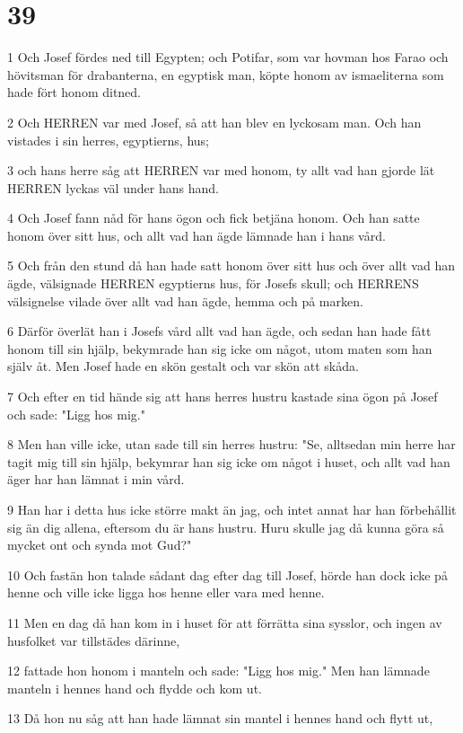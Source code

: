 \chapter{39}

\par 1 Och Josef fördes ned till Egypten; och Potifar, som var hovman hos Farao och hövitsman för drabanterna, en egyptisk man, köpte honom av ismaeliterna som hade fört honom ditned.
\par 2 Och HERREN var med Josef, så att han blev en lyckosam man. Och han vistades i sin herres, egyptierns, hus;
\par 3 och hans herre såg att HERREN var med honom, ty allt vad han gjorde lät HERREN lyckas väl under hans hand.
\par 4 Och Josef fann nåd för hans ögon och fick betjäna honom. Och han satte honom över sitt hus, och allt vad han ägde lämnade han i hans vård.
\par 5 Och från den stund då han hade satt honom över sitt hus och över allt vad han ägde, välsignade HERREN egyptierns hus, för Josefs skull; och HERRENS välsignelse vilade över allt vad han ägde, hemma och på marken.
\par 6 Därför överlät han i Josefs vård allt vad han ägde, och sedan han hade fått honom till sin hjälp, bekymrade han sig icke om något, utom maten som han själv åt. Men Josef hade en skön gestalt och var skön att skåda.
\par 7 Och efter en tid hände sig att hans herres hustru kastade sina ögon på Josef och sade: "Ligg hos mig."
\par 8 Men han ville icke, utan sade till sin herres hustru: "Se, alltsedan min herre har tagit mig till sin hjälp, bekymrar han sig icke om något i huset, och allt vad han äger har han lämnat i min vård.
\par 9 Han har i detta hus icke större makt än jag, och intet annat har han förbehållit sig än dig allena, eftersom du är hans hustru. Huru skulle jag då kunna göra så mycket ont och synda mot Gud?"
\par 10 Och fastän hon talade sådant dag efter dag till Josef, hörde han dock icke på henne och ville icke ligga hos henne eller vara med henne.
\par 11 Men en dag då han kom in i huset för att förrätta sina sysslor, och ingen av husfolket var tillstädes därinne,
\par 12 fattade hon honom i manteln och sade: "Ligg hos mig." Men han lämnade manteln i hennes hand och flydde och kom ut.
\par 13 Då hon nu såg att han hade lämnat sin mantel i hennes hand och flytt ut,
